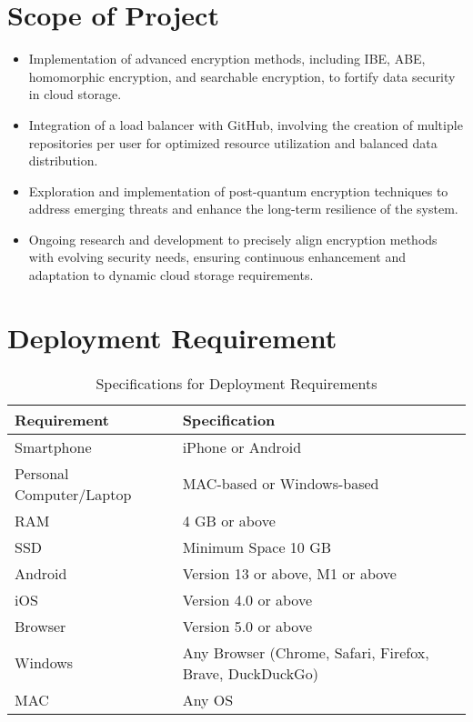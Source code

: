 \section{Scope of Project }
\begin{itemize}
  \item Implementation of advanced encryption methods, including IBE, ABE, homomorphic encryption,
and searchable encryption, to fortify data security in cloud storage. 
\item Integration of a load balancer with GitHub, involving the creation of multiple repositories per user
for optimized resource utilization and balanced data distribution. 

\item Exploration and implementation of post-quantum encryption techniques to address emerging threats
and enhance the long-term resilience of the system.  
\item Ongoing research and development to precisely align encryption methods with evolving security
needs, ensuring continuous enhancement and adaptation to dynamic cloud storage requirements. 
\end{itemize}



\newpage
 \begin{table}[h]
 \section{Deployment Requirement}
    \centering
    \caption{Specifications for Deployment Requirements}
    
    \begin{tabular}{|p{6cm}|p{8cm}|}
    
        \hline
        \textbf{Requirement} & \textbf{Specification} \\
        \hline
        Smartphone & iPhone or Android \\
        \hline
        Personal Computer/Laptop & MAC-based or Windows-based \\
        \hline
        RAM & 4 GB or above \\
        \hline
        SSD & Minimum Space 10 GB \\
        \hline
        Android & Version 13 or above, M1 or above \\
        \hline
        iOS & Version 4.0 or above \\
        \hline
        Browser & Version 5.0 or above \\
        \hline
        Windows & Any Browser (Chrome, Safari, Firefox, Brave, DuckDuckGo) \\
        \hline
        MAC & Any OS \\
        \hline
    \end{tabular}
\end{table}


